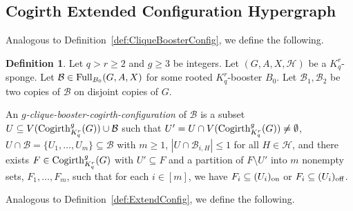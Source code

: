 \documentclass[11pt]{article}
\newcommand{\mc}[1]{\mathcal{#1}}
\newcounter{i}
\theoremstyle{plain}
\theoremstyle{plain} %
\theoremstyle{definition}
\newtheorem{definition}[thm]{Definition}
\begin{document}
\subsection{Cogirth Extended Configuration Hypergraph}

Analogous to Definition~\ref{def:CliqueBoosterConfig}, we define the following. 

\begin{definition}
Let $q>r\ge 2$ and $g\ge 3$ be integers. Let $(G,A,X,\mc{H})$ be a $K_q^r$-sponge. Let $\mc{B} \in {\rm Full}_{B_0}(G,A,X)$ for some rooted $K_q^r$-booster $B_0$.  Let $\mc{B}_1, \mc{B}_2$ be two copies of $\mc{B}$ on disjoint copies of $G$.


An \emph{$g$-clique-booster-cogirth-configuration} of $\mc{B}$ is a subset $U\subseteq V({\rm Cogirth}^g_{K_q^r}(G))\cup \mc{B}$ such that $U'= U\cap V({\rm Cogirth}^g_{K_q^r}(G))\ne \emptyset$, $U\cap \mc{B} =\{U_1,\ldots,U_m\}\subseteq \mc{B}$ with $m\ge 1$, $|U\cap \mc{B}_{i,H}|\le 1$ for all $H\in \mc{H}$, and there exists $F\in {\rm Cogirth}_{K_q^r}^g(G)$ with $U'\subseteq F$ and a partition of $F\setminus U'$ into $m$ nonempty sets, $F_1,\ldots, F_m$, such that for each $i\in [m]$, we have $F_i\subseteq (U_i)_{\rm on}$ or $F_i\subseteq (U_i)_{\rm off}$.
\end{definition}

Analogous to Definition~\ref{def:ExtendConfig}, we define the following. 
\end{document}

